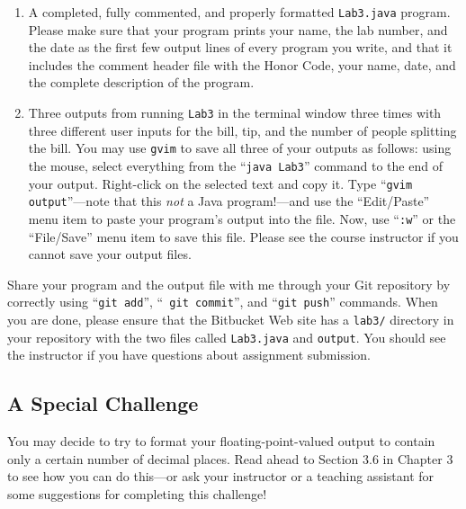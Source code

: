 \begin{enumerate}

        \item A completed, fully commented, and properly formatted {\tt Lab3.java} program. Please make sure that your
          program prints your name, the lab number, and the date as the first few output lines of every program you
          write, and that it includes the comment header file with the Honor Code, your name, date, and the complete
          description of the program.

        \item Three outputs from running {\tt Lab3} in the terminal window three times with three different
          user inputs for the bill, tip, and the number of people splitting the bill. You may use {\tt gvim} to save all
          three of your outputs as follows: using the mouse, select everything from the ``{\tt java Lab3}'' command to
          the end of your output.  Right-click on the selected text and copy it.  Type ``{\tt gvim output}''---note that
          this {\em not} a Java program!---and use the ``Edit/Paste'' menu item to paste your program's output into the
          file.  Now, use ``{\tt :w}'' or the ``File/Save'' menu item to save this file. Please see the course
          instructor if you cannot save your output files.

\end{enumerate}
\vspace{-0.1in}
Share your program and the output file with me through your Git repository by correctly using ``{\tt git add}'', ``{\tt
git commit}'', and ``{\tt git push}'' commands. When you are done, please ensure that the Bitbucket Web site has
a {\tt lab3/} directory in your repository with the two files called {\tt Lab3.java} and {\tt output}. You should see
the instructor if you have questions about assignment submission.

\vspace{-0.1in}
\subsection*{A Special Challenge}

You may decide to try to format your floating-point-valued output to contain only a certain number of decimal places.
Read ahead to Section 3.6 in Chapter 3 to see how you can do this---or ask your instructor or a teaching assistant for
some suggestions for completing this challenge!


